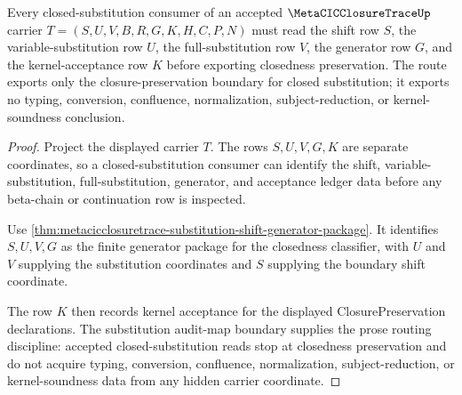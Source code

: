 \begin{theorem}
\label{thm:metacicclosuretrace-closed-substitution-route}
Every closed-substitution consumer of an accepted $\MetaCICClosureTraceUp$ carrier $T=(S,U,V,B,R,G,K,H,C,P,N)$ must read the shift row $S$, the variable-substitution row $U$, the full-substitution row $V$, the generator row $G$, and the kernel-acceptance row $K$ before exporting closedness preservation. The route exports only the closure-preservation boundary for closed substitution; it exports no typing, conversion, confluence, normalization, subject-reduction, or kernel-soundness conclusion.
\end{theorem}
\begin{proof}
Project the displayed carrier $T$. The rows $S,U,V,G,K$ are separate coordinates, so a closed-substitution consumer can identify the shift, variable-substitution, full-substitution, generator, and acceptance ledger data before any beta-chain or continuation row is inspected.

Use \autoref{thm:metacicclosuretrace-substitution-shift-generator-package}. It identifies $S,U,V,G$ as the finite generator package for the closedness classifier, with $U$ and $V$ supplying the substitution coordinates and $S$ supplying the boundary shift coordinate.

The row $K$ then records kernel acceptance for the displayed ClosurePreservation declarations. The substitution audit-map boundary supplies the prose routing discipline: accepted closed-substitution reads stop at closedness preservation and do not acquire typing, conversion, confluence, normalization, subject-reduction, or kernel-soundness data from any hidden carrier coordinate.
\end{proof}

